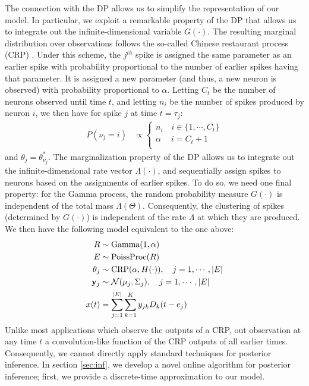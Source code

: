 The connection with the DP allows us to simplify the representation of our model. In particular, we exploit a remarkable property of the DP that
allows us to integrate out the infinite-dimensional variable $G(\cdot)$. The resulting marginal distribution over observations follows the so-called
 Chinese restaurant process (CRP) \citep{Pit2002a}. Under this scheme, the $j^{th}$ spike is assigned the same parameter as an earlier spike with probability 
proportional to the number of earlier spikes having that parameter. It is assigned a new parameter (and thus, a new neuron is observed) with probability 
proportional to $\alpha$. Letting $C_t$ be the number of neurons observed until time $t$, and letting $n_i$ be the number of spikes produced by neuron $i$,
we then have for spike $j$ at time $t = \tau_j$: 
\begin{align}
  P({\nu_j} = i) & \propto 
  \begin{cases}
   n_i \quad i \in \{1,\cdots, C_{t}\} \\
   \alpha \quad\ i = C_{t} + 1 \\
  \end{cases}  
\label{eq:crp_marg_pr}
\end{align}
and $\theta_j = \theta^*_{\nu_j}$. 
The marginalization property of the DP allows us to integrate out the infinite-dimensional rate vector $\Lambda(\cdot)$, and sequentially 
assign spikes to neurons based on the assignments of earlier spikes.
To do so, we need one final property: for the Gamma process, the random probability measure $G(\cdot)$ is independent of the total mass $\Lambda(\Theta)$. 
Consequently, the clustering of spikes (determined by $G(\cdot)$) is independent of the rate $\Lambda$ at which they are produced. We then have
 the following model equivalent to the one above:
\begin{align}
  R & \sim \text{Gamma}(1,\alpha) \\
  E &\sim \text{PoissProc}(R) \\
  \theta_j &\sim \text{CRP}(\alpha, H(\cdot)), \quad j = 1,\cdots, |E|   \label{eq:CRP}\\
  \mathbf{y}_j &\sim \mathcal{N}(\mu_{j}, \Sigma_{j}), \quad  j = 1,\cdots, |E|   \label{eq:CRP_mix}\\
  x(t) &=   \sum_{j=1}^{|E|} \sum_{k=1}^K y_{jk} D_k(t - e_{j})
\end{align}
Unlike most applications which observe the outputs of a CRP, out observation at any time $t$ a convolution-like function of the CRP outputs of all
earlier times. Consequently, we cannot directly apply standard techniques for posterior inference. In section \ref{sec:inf}, we develop a novel online 
algorithm for posterior inference; first, we provide a discrete-time approximation to our model.

